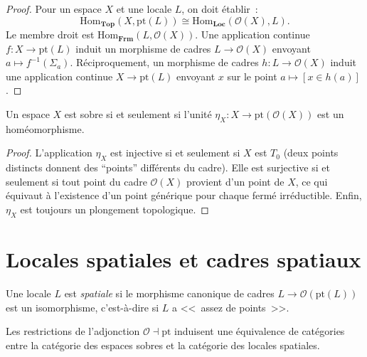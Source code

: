 \begin{proof}
Pour un espace $X$ et une locale $L$, on doit \'etablir~:
\[
  \mathrm{Hom}_{\mathbf{Top}}(X, \mathrm{pt}(L)) \cong
  \mathrm{Hom}_{\mathbf{Loc}}(\mathcal{O}(X), L).
\]
Le membre droit est $\mathrm{Hom}_{\mathbf{Frm}}(L, \mathcal{O}(X))$. Une application
continue $f\colon X \to \mathrm{pt}(L)$ induit un morphisme de cadres
$L \to \mathcal{O}(X)$ envoyant $a \mapsto f^{-1}(\Sigma_a)$. R\'eciproquement, un
morphisme de cadres $h\colon L \to \mathcal{O}(X)$ induit une application continue
$X \to \mathrm{pt}(L)$ envoyant $x$ sur le point $a \mapsto [x \in h(a)]$.
\end{proof}

\begin{theoreme}
Un espace $X$ est sobre si et seulement si l'unit\'e $\eta_X\colon X \to
\mathrm{pt}(\mathcal{O}(X))$ est un hom\'eomorphisme.
\end{theoreme}

\begin{proof}
L'application $\eta_X$ est injective si et seulement si $X$ est $T_0$ (deux points
distincts donnent des ``points'' diff\'erents du cadre). Elle est surjective si et seulement
si tout point du cadre $\mathcal{O}(X)$ provient d'un point de $X$, ce qui \'equivaut
\`a l'existence d'un point g\'en\'erique pour chaque ferm\'e irr\'eductible. Enfin, $\eta_X$
est toujours un plongement topologique.
\end{proof}

\section{Locales spatiales et cadres spatiaux}

\begin{definition}
Une locale $L$ est \emph{spatiale} si le morphisme canonique de cadres
$L \to \mathcal{O}(\mathrm{pt}(L))$ est un isomorphisme, c'est-\`a-dire si $L$ a
<<~assez de points~>>.
\end{definition}

\begin{theoreme}
Les restrictions de l'adjonction $\mathcal{O} \dashv \mathrm{pt}$ induisent une
\'equivalence de cat\'egories entre la cat\'egorie des espaces sobres et la cat\'egorie des
locales spatiales.
\end{theoreme}

